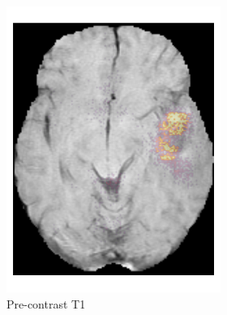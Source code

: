 \begin{figure}[htbp]
\begin{subfigure}[b]{\textwidth}
\begin{subfigure}[b]{0.24\textwidth}
        \includegraphics[width=\textwidth]{Figures/saliency_HGG_T1.png}
        \caption*{Pre-contrast \acrshort{T1}}
        \end{subfigure}
        \hfill
        \begin{subfigure}[b]{0.24\textwidth}

\end{subfigure}
\end{subfigure}
\end{figure}
